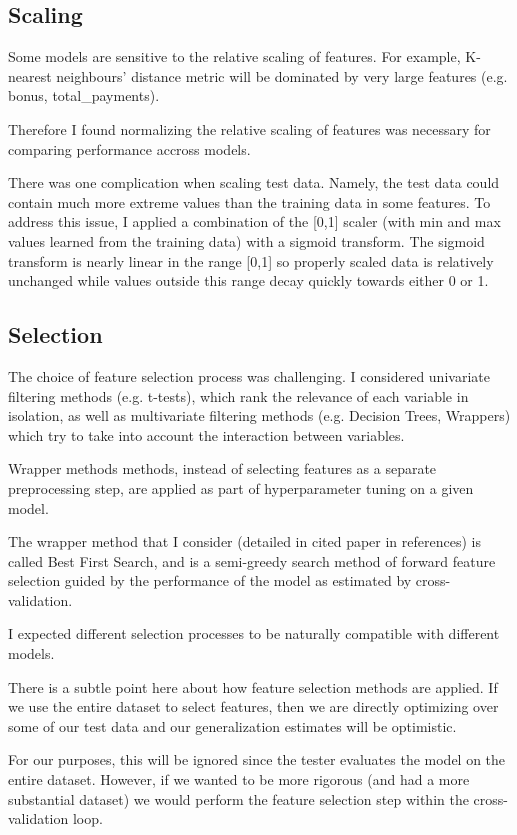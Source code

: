 \documentclass{article}
\begin{document}
\subsection{Scaling}

Some models are sensitive to the relative scaling of features. For example, K-nearest neighbours' distance metric will be dominated by very large features (e.g. bonus, total\_payments).

Therefore I found normalizing the relative scaling of features was necessary for comparing performance accross models. 

There was one complication when scaling test data. Namely, the test data could contain much more extreme values than the training data in some features. To address this issue, I applied a combination of the [0,1] scaler (with min and max values learned from the training data) with a sigmoid transform. The sigmoid transform is nearly linear in the range [0,1] so properly scaled data is relatively unchanged while values outside this range decay quickly towards either 0 or 1.

\subsection{Selection}


The choice of feature selection process was challenging. I considered univariate filtering methods (e.g. t-tests), which rank the relevance of each variable in isolation, as well as multivariate filtering methods (e.g. Decision Trees, Wrappers) which try to take into account the interaction between variables.

Wrapper methods methods, instead of selecting features as a separate preprocessing step, are applied as part of hyperparameter tuning on a given model.

The wrapper method that I consider (detailed in cited paper in references) is called Best First Search, and is a semi-greedy search method of forward feature selection guided by the performance of the model as estimated by cross-validation. 

I expected different selection processes to be naturally compatible with different models.

There is a subtle point here about how feature selection methods are applied. If we use the entire dataset to select features, then we are directly optimizing over some of our test data and our generalization estimates will be optimistic.

For our purposes, this will be ignored since the tester evaluates the model on the entire dataset. However, if we wanted to be more rigorous (and had a more substantial dataset) we would perform the feature selection step within the cross-validation loop.
\end{document}
